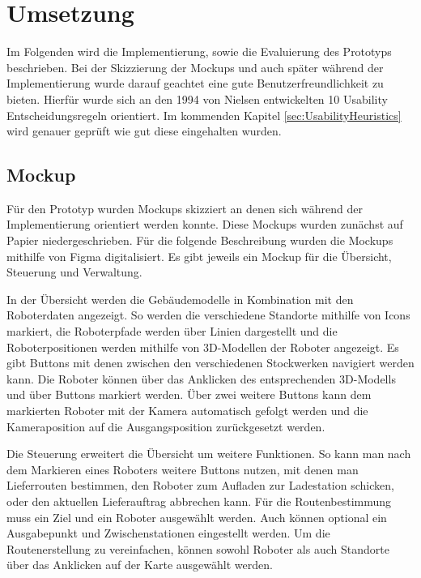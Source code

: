 
\newpage
\section{Umsetzung}
Im Folgenden wird die Implementierung, sowie die Evaluierung des Prototyps beschrieben. Bei der Skizzierung der Mockups und auch später während der Implementierung wurde darauf geachtet eine gute Benutzerfreundlichkeit zu bieten. Hierfür wurde sich an den 1994 von Nielsen entwickelten 10 Usability Entscheidungsregeln \cite{Nielsen.1994} orientiert. Im kommenden Kapitel \ref{sec:UsabilityHeuristics} wird genauer geprüft wie gut diese eingehalten wurden.

\subsection{Mockup}
Für den Prototyp wurden Mockups skizziert an denen sich während der Implementierung orientiert werden konnte. Diese Mockups wurden zunächst auf Papier niedergeschrieben. Für die folgende Beschreibung wurden die Mockups mithilfe von Figma \cite{Figma} digitalisiert. Es gibt jeweils ein Mockup für die Übersicht, Steuerung und Verwaltung.

In der Übersicht werden die Gebäudemodelle in Kombination mit den Roboterdaten angezeigt. So werden die verschiedene Standorte mithilfe von Icons markiert, die Roboterpfade werden über Linien dargestellt und die Roboterpositionen werden mithilfe von 3D-Modellen der Roboter angezeigt. Es gibt Buttons mit denen zwischen den verschiedenen Stockwerken navigiert werden kann. Die Roboter können über das Anklicken des entsprechenden 3D-Modells und über Buttons markiert werden. Über zwei weitere Buttons kann dem markierten Roboter mit der Kamera automatisch gefolgt werden und die Kameraposition auf die Ausgangsposition zurückgesetzt werden.

Die Steuerung erweitert die Übersicht um weitere Funktionen. So kann man nach dem Markieren eines Roboters weitere Buttons nutzen, mit denen man Lieferrouten bestimmen, den Roboter zum Aufladen zur Ladestation schicken, oder den aktuellen Lieferauftrag abbrechen kann. Für die Routenbestimmung muss ein Ziel und ein Roboter ausgewählt werden. Auch können optional ein Ausgabepunkt und Zwischenstationen eingestellt werden. Um die Routenerstellung zu vereinfachen, können sowohl Roboter als auch Standorte über das Anklicken auf der Karte ausgewählt werden.

